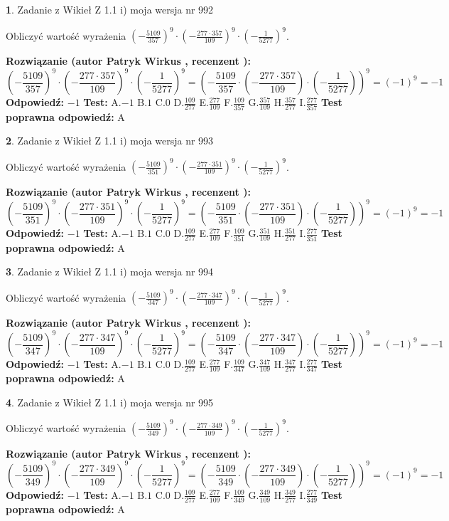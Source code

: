 \documentclass[12pt, a4paper]{article}
\theoremstyle{definition} %
\newtheorem{zad}{}
\newcommand{\zadStart}[1]{\begin{zad}#1\newline}
\newcommand{\zadStop}{\end{zad}}
\newcommand{\rozwStart}[2]{\noindent \textbf{Rozwiązanie (autor #1 , recenzent #2): }\newline}
\newcommand{\rozwStop}{\newline}
\newcommand{\odpStart}{\noindent \textbf{Odpowiedź:}\newline}
\newcommand{\odpStop}{\newline}
\newcommand{\testStart}{\noindent \textbf{Test:}\newline}
\newcommand{\testStop}{\newline}
\newcommand{\kluczStart}{\noindent \textbf{Test poprawna odpowiedź:}\newline}
\newcommand{\kluczStop}{\newline}
\begin{document}
\zadStart{Zadanie z Wikieł Z 1.1 i) moja wersja nr 992}

Obliczyć wartość wyrażenia $(-\frac{5109}{357})^{9} \cdot (-\frac{277 \cdot 357}{109})^{9} \cdot (-\frac{1}{5277})^{9}$.
\zadStop
\rozwStart{Patryk Wirkus}{}
$$(-\frac{5109}{357})^{9} \cdot (-\frac{277 \cdot 357}{109})^{9} \cdot (-\frac{1}{5277})^{9} = (-\frac{5109}{357} \cdot (-\frac{277 \cdot 357}{109}) \cdot (-\frac{1}{5277}))^{9} = (-1)^{9} = -1$$
\rozwStop
\odpStart
$-1$
\odpStop
\testStart
A.$-1$ B.$1$ C.$0$ D.$\frac{109}{277}$ E.$\frac{277}{109}$
F.$\frac{109}{357}$ G.$\frac{357}{109}$
H.$\frac{357}{277}$
I.$\frac{277}{357}$
\testStop
\kluczStart
A
\kluczStop



\zadStart{Zadanie z Wikieł Z 1.1 i) moja wersja nr 993}

Obliczyć wartość wyrażenia $(-\frac{5109}{351})^{9} \cdot (-\frac{277 \cdot 351}{109})^{9} \cdot (-\frac{1}{5277})^{9}$.
\zadStop
\rozwStart{Patryk Wirkus}{}
$$(-\frac{5109}{351})^{9} \cdot (-\frac{277 \cdot 351}{109})^{9} \cdot (-\frac{1}{5277})^{9} = (-\frac{5109}{351} \cdot (-\frac{277 \cdot 351}{109}) \cdot (-\frac{1}{5277}))^{9} = (-1)^{9} = -1$$
\rozwStop
\odpStart
$-1$
\odpStop
\testStart
A.$-1$ B.$1$ C.$0$ D.$\frac{109}{277}$ E.$\frac{277}{109}$
F.$\frac{109}{351}$ G.$\frac{351}{109}$
H.$\frac{351}{277}$
I.$\frac{277}{351}$
\testStop
\kluczStart
A
\kluczStop



\zadStart{Zadanie z Wikieł Z 1.1 i) moja wersja nr 994}

Obliczyć wartość wyrażenia $(-\frac{5109}{347})^{9} \cdot (-\frac{277 \cdot 347}{109})^{9} \cdot (-\frac{1}{5277})^{9}$.
\zadStop
\rozwStart{Patryk Wirkus}{}
$$(-\frac{5109}{347})^{9} \cdot (-\frac{277 \cdot 347}{109})^{9} \cdot (-\frac{1}{5277})^{9} = (-\frac{5109}{347} \cdot (-\frac{277 \cdot 347}{109}) \cdot (-\frac{1}{5277}))^{9} = (-1)^{9} = -1$$
\rozwStop
\odpStart
$-1$
\odpStop
\testStart
A.$-1$ B.$1$ C.$0$ D.$\frac{109}{277}$ E.$\frac{277}{109}$
F.$\frac{109}{347}$ G.$\frac{347}{109}$
H.$\frac{347}{277}$
I.$\frac{277}{347}$
\testStop
\kluczStart
A
\kluczStop



\zadStart{Zadanie z Wikieł Z 1.1 i) moja wersja nr 995}

Obliczyć wartość wyrażenia $(-\frac{5109}{349})^{9} \cdot (-\frac{277 \cdot 349}{109})^{9} \cdot (-\frac{1}{5277})^{9}$.
\zadStop
\rozwStart{Patryk Wirkus}{}
$$(-\frac{5109}{349})^{9} \cdot (-\frac{277 \cdot 349}{109})^{9} \cdot (-\frac{1}{5277})^{9} = (-\frac{5109}{349} \cdot (-\frac{277 \cdot 349}{109}) \cdot (-\frac{1}{5277}))^{9} = (-1)^{9} = -1$$
\rozwStop
\odpStart
$-1$
\odpStop
\testStart
A.$-1$ B.$1$ C.$0$ D.$\frac{109}{277}$ E.$\frac{277}{109}$
F.$\frac{109}{349}$ G.$\frac{349}{109}$
H.$\frac{349}{277}$
I.$\frac{277}{349}$
\testStop
\kluczStart
A
\kluczStop
\end{document}
